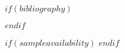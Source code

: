 \documentclass[$journal$,$type$,$status$,oneauthor,pdftex,10pt,a4paper]{sesmo}
\begin{document}

$if(bibliography)$

$endif$

$if(sampleavailability)$
$endif$

\end{document}
